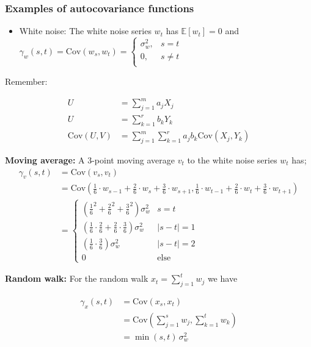 \documentclass{article}
\begin{document}
\subsubsection{Examples of autocovariance functions}
\begin{itemize}
    \item White noise: The white noise series $w_t$ has $\mathbb{E}[w_t] = 0$ and $\gamma_w(s,t) = \text{Cov}(w_s,w_t) = \begin{cases}
        \sigma^2_w, & s = t\\
        0, & s \neq t\\
    \end{cases}$
\end{itemize}


Remember:

\begin{align*}
    U &= \sum_{j=1}^m a_j X_j\\
    U &= \sum_{k=1}^r b_k Y_k\\
    \text{Cov}(U,V) &= \sum_{j=1}^m \sum_{k=1}^r a_j b_k \text{Cov}(X_j,Y_k)
\end{align*}


\textbf{Moving average:} A 3-point moving average $v_t$ to the white noise series $w_t$ has;
\begin{align*}
    \gamma_v (s,t) &= \text{Cov}(v_s,v_t)\\
    &= \text{Cov}(\frac{1}{6}\cdot w_{s-1} + \frac{2}{6} \cdot w_s + \frac{3}{6} \cdot w_{s+1}, \frac{1}{6}\cdot w_{t-1} + \frac{2}{6} \cdot w_t + \frac{3}{6} \cdot w_{t+1})\\
    &= \begin{cases}
        (\frac{1}{6}^2 + \frac{2}{6}^2 + \frac{3}{6}^2) \sigma^2_w &s = t\\
        (\frac{1}{6}\cdot \frac{2}{6} + \frac{2}{6}\cdot \frac{3}{6}) \sigma^2_w &|s - t| = 1\\
        (\frac{1}{6} \cdot \frac{3}{6})\sigma^2_w   &|s - t| = 2\\
        0 &\text{else}
    \end{cases}
\end{align*}


\textbf{Random walk:} For the random walk $x_t = \sum_{j=1}^t w_j$ we have 

\begin{align*}
    \gamma_x (s,t) &= \text{Cov}(x_s,x_t)\\
    &= \text{Cov}(\sum_{j=1}^s w_j, \sum_{k=1}^t w_k)\\
    &= \min(s,t) \, \sigma^2_w\\
\end{align*}
\end{document}
